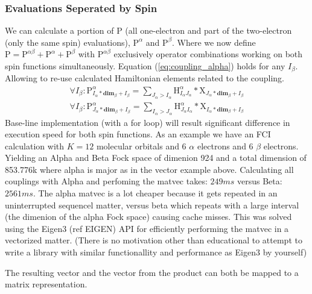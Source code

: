 \subsubsection{Evaluations Seperated by Spin}
We can calculate a portion of P (all one-electron and part of the two-electron (only the same spin) evaluations), $\text{P}^{\alpha}$ and $\text{P}^{\beta}$.
Where we now define $\text{P} = \text{P}^{\alpha \beta} + \text{P}^{\alpha} + \text{P}^{\beta}$ with $\text{P}^{\alpha \beta}$ exclusively operator combinations working on both spin functions simultaneously.
Equation (\ref{eq:coupling_alpha}) holds for any $I_\beta$.
Allowing to re-use calculated Hamiltonian elements related to the coupling.
\begin{align}
  \forall I_\beta: \text{P}^{\alpha}_{I_\alpha * \textbf{dim}_\beta + I_\beta} = \sum_{J_\alpha > I_\alpha} \text{H}^{\alpha}_{I_\alpha J_\alpha} * \text{X}_{J_\alpha * \textbf{dim}_\beta + I_\beta} \\
  \forall I_\beta: \text{P}^{\alpha}_{J_\alpha * \textbf{dim}_\beta + I_\beta} = \sum_{I_\alpha > J_\alpha} \text{H}^{\alpha}_{J_\alpha I_\alpha} * \text{X}_{I_\alpha * \textbf{dim}_\beta + I_\beta}
\end{align}
Base-line implementation (with a for loop) will result significant difference in execution speed for both spin functions.
As an example we have an FCI calculation with $K=12$ molecular orbitals and 6 $\alpha$ electrons and 6 $\beta$ electrons.
Yielding an Alpha and Beta Fock space of dimenion 924 and a total dimension of 853.776k where alpha is major as in the vector example above.
Calculating all couplings with Alpha and perfoming the matvec takes: $249 ms$ versus Beta: $2561 ms$.
The alpha matvec is a lot cheaper because it gets repeated in an uninterrupted sequencel matter, versus beta which repeats with a large interval (the dimenion of the alpha Fock space) causing cache misses. This was solved using the Eigen3 (ref EIGEN) API for efficiently performing the matvec in a vectorized matter. (There is no motivation other than educational to attempt to write a library with similar functionallity and performance as Eigen3 by yourself)

The resulting vector and the vector from the product can both be mapped to a matrix representation.

